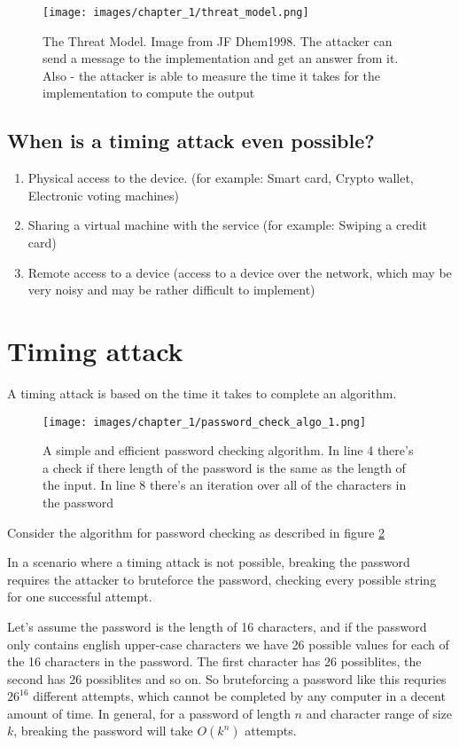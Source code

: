 \begin{figure}[H]
    \centering
    \texttt{[image: images/chapter\_1/threat\_model.png]}
    \caption{The Threat Model. Image from JF Dhem1998. The attacker can send a
     message to the implementation and get an answer from it. Also - the
     attacker is able to measure the time it takes for the implementation to
     compute the output}
    \label{c1_fig_threat_model}
\end{figure}

\subsection{When is a timing attack even possible?}
\begin{enumerate}
    \item Physical access to the device. (for example: Smart card, Crypto
    wallet, Electronic voting machines)
    \item Sharing a virtual machine with the service (for example: Swiping a
    credit card)
    \item Remote access to a device (access to a device over the network, which
    may be very noisy and may be rather difficult to implement)
\end{enumerate}



\section{Timing attack}
    A timing attack is based on the time it takes to complete an algorithm.


\begin{figure}[H]
    \centering
    \texttt{[image: images/chapter\_1/password\_check\_algo\_1.png]}
    \caption{A simple and efficient password checking algorithm. In line 4
    there's a check if there length of the password is the same as the length of
    the input. In line 8 there's an iteration over all of the characters in the password
    }
    \label{c1_fig_pass_check_1}
\end{figure}

Consider the algorithm for password checking as described in figure
\ref{c1_fig_pass_check_1}

In a scenario where a timing attack is not possible, breaking the password
 requires the attacker to bruteforce the password, checking every
 possible string for one successful attempt.

Let's assume the password is the length of 16 characters, and if the password only contains english
upper-case characters we have 26 possible values for each of the 16 characters
in the password. The first character has 26 possiblites, the second has 26
possiblites and so on. So bruteforcing a password like this requries ${26}^{16}$
different attempts, which cannot be completed by any computer in a decent amount
of time. In general, for a password of length $n$ and character range of size
$k$, breaking the password will take $O({k}^{n})$ attempts.


